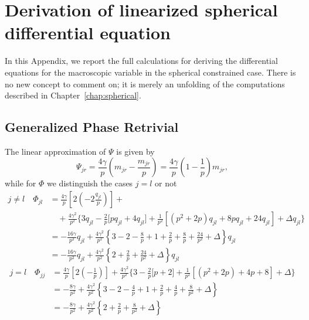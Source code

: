 \chapter[Derivation of linearized spherical ODE]{Derivation of linearized spherical differential equation}
\label{app:derivation-spherical-ode}
In this Appendix, we report the full calculations for deriving the differential equations
for the macroscopic variable in the spherical constrained case.
There is no new concept to comment on; it is merely an unfolding of the computations described in Chapter~\ref{chap:spherical}.
\section{Generalized Phase Retrivial}
The linear approximation of \(\Psi\) is given by
\begin{equation}
  \Psi_{jr} = \frac{4 \gamma}{p}
      \left(m_{jr} - \frac{m_{jr}}{p}\right) 
      = \frac{4 \gamma}{p} \left(1 - \frac{1}{p}\right) m_{jr},
\end{equation}
while for \(\Phi\) we distinguish the cases \(j=l\) or not
\begin{equation}\begin{split}
  j \neq l \quad \Phi_{jl} &= \frac{4 \gamma}{p}\left[
      2\left( - 2\frac{q_{jl}}{p}\right)
  \right] +\\
  &\quad+\frac{4 \gamma^2}{p^2} \Biggr\{
        3 q_{jl} -\frac2{p}\Biggl[p q_{jl} + 4 q_{jl} \Biggl] + 
        \frac1{p^2}\left[\left(p^2+2p\right)q_{jl} +
        8p q_{jl} + 24q_{jl} \right] + \Delta q_{jl}\Biggr\} \\ 
  &= -\frac{16 \gamma}{p^2} q_{jl} 
    +\frac{4 \gamma^2}{p^2} \left\{
      3 -2 -\frac{8}{p} +1 +\frac2p +\frac8p + \frac{24}{p^2} + \Delta \right\}q_{jl} \\
  &= -\frac{16 \gamma}{p^2} q_{jl} 
  +\frac{4 \gamma^2}{p^2} \left\{2 +\frac{2}{p} + \frac{24}{p^2} + \Delta \right\}q_{jl}
\end{split}\end{equation}
\begin{equation}\begin{split}
  j = l \quad \Phi_{jj} &= \frac{4 \gamma}{p}\left[
      2\left( -\frac{1}{p}\right)
  \right] + \frac{4 \gamma^2}{p^2} \Biggr\{
        3 -\frac2{p}\Biggl[p + 2 \Biggl] + 
        \frac1{p^2}\left[\left(p^2+2p\right) +
        4p + 8 \right] + \Delta\Biggr\} \\
  &= -\frac{8 \gamma}{p^2} + \frac{4 \gamma^2}{p^2} \left\{
    3 -2 -\frac{4}{p} +1 +\frac2p +\frac4p + \frac{8}{p^2} + \Delta \right\} \\
  &= -\frac{8 \gamma}{p^2} +\frac{4 \gamma^2}{p^2} \left\{2 +\frac{2}{p} + \frac{8}{p^2} + \Delta \right\}
\end{split}\end{equation}

